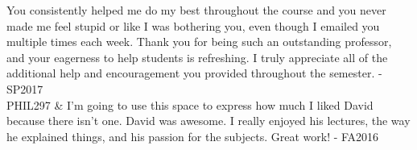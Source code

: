 \documentclass[p1noheader, 11pt, lightmode]{lightcv}
\begin{document}
\begin{dated}
    You consistently helped me do my best throughout the course and you never made me
    feel stupid or like I was bothering you, even though I emailed you multiple times each
    week. Thank you for being such an outstanding professor, and your eagerness to help
    students is refreshing. I truly appreciate all of the additional help and encouragement
    you provided throughout the semester. - SP2017\\
    PHIL297 & I’m going to use this space to express how much I liked David because there
    isn’t one. David was awesome. I really enjoyed his lectures, the way he explained
    things, and his passion for the subjects. Great work! - FA2016
\end{dated}
\end{document}

